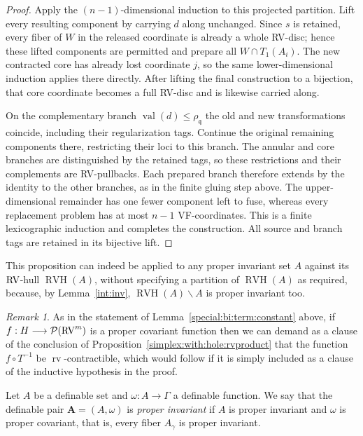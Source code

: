 \documentclass[12pt]{amsart}
\newcommand{\memph}[1]{{\color{magenta}\emph{#1}}}
\theoremstyle{plain}
\theoremstyle{definition}
\theoremstyle{remark}
\newtheorem{rem}[thm]{Remark}
\numberwithin{equation}{section}
\theoremstyle{plain}
\newcommand{\RV}{\textup{RV}}
\newcommand{\gq}{\mathfrak{q}}
\newcommand{\0}{\emptyset}
\newcommand{\mdl}[1]{\mathcal{#1}}  %
\newcommand{\fun}{\longrightarrow}
\newcommand{\mi}{\smallsetminus}
\DeclareMathOperator{\rv}{rv}
\DeclareMathOperator{\vv}{val}
\DeclareMathOperator{\RVH}{RVH}
\begin{document}
\begin{proof}
Apply the $(n-1)$-dimensional induction to this projected partition. Lift every resulting component by carrying $d$ along unchanged. Since $s$ is retained, every fiber of $W$ in the released coordinate is already a whole RV-disc; hence these lifted components are permitted and prepare all $W\cap T_1(A_i)$. The new contracted core has already lost coordinate $j$, so the same lower-dimensional induction applies there directly. After lifting the final construction to a bijection, that core coordinate becomes a full RV-disc and is likewise carried along.

On the complementary branch $\vv(d)\leq\rho_\gq$ the old and new transformations coincide, including their regularization tags. Continue the original remaining components there, restricting their loci to this branch. The annular and core branches are distinguished by the retained tags, so these restrictions and their complements are RV-pullbacks. Each prepared branch therefore extends by the identity to the other branches, as in the finite gluing step above. The upper-dimensional remainder has one fewer component left to fuse, whereas every replacement problem has at most $n-1$ VF-coordinates. This is a finite lexicographic induction and completes the construction. All source and branch tags are retained in its bijective lift.
\end{proof}


This proposition can indeed be applied to any proper invariant set $A$ against its $\RV$-hull $\RVH(A)$, without specifying a partition of $\RVH(A)$ as required, because, by  Lemma~\ref{int:inv},   $\RVH(A) \mi A$ is proper invariant too.

\begin{rem}\label{cons:extra}
As in the statement of Lemma~\ref{special:bi:term:constant} above, if $f : H \fun \mdl P(\RV^m)$ is a proper covariant function then we can demand as a clause of the conclusion of Proposition~\ref{simplex:with:hole:rvproduct} that the function $f \circ T^{-1}$ be $\rv$-contractible, which would follow if it is simply included as a clause of the inductive hypothesis in the proof.
\end{rem}

Let $A$ be a definable set and $\omega : A \fun \Gamma$ a definable function. We say that the definable pair $\bm A = (A, \omega)$ is \memph{proper invariant} if $A$ is proper invariant and $\omega$ is proper covariant, that is, every fiber $A_\gamma$ is proper invariant.
\end{document}
